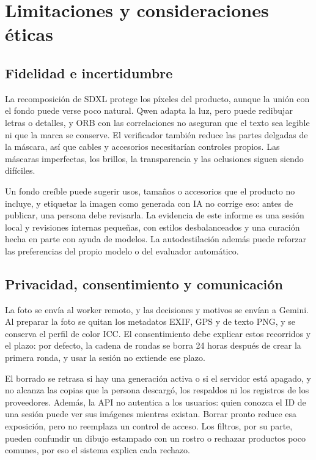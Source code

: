 \documentclass[11pt,a4paper]{article}
\begin{document}
\clearpage
\section{Limitaciones y consideraciones éticas}
\subsection{Fidelidad e incertidumbre}
La recomposición de SDXL protege los píxeles del producto, aunque la unión con el fondo puede verse poco natural. Qwen adapta la luz, pero puede redibujar letras o detalles, y ORB con las correlaciones no aseguran que el texto sea legible ni que la marca se conserve. El verificador también reduce las partes delgadas de la máscara, así que cables y accesorios necesitarían controles propios. Las máscaras imperfectas, los brillos, la transparencia y las oclusiones siguen siendo difíciles.

Un fondo creíble puede sugerir usos, tamaños o accesorios que el producto no incluye, y etiquetar la imagen como generada con IA no corrige eso: antes de publicar, una persona debe revisarla. La evidencia de este informe es una sesión local y revisiones internas pequeñas, con estilos desbalanceados y una curación hecha en parte con ayuda de modelos. La autodestilación además puede reforzar las preferencias del propio modelo o del evaluador automático.

\subsection{Privacidad, consentimiento y comunicación}
La foto se envía al worker remoto, y las decisiones y motivos se envían a Gemini. Al preparar la foto se quitan los metadatos EXIF, GPS y de texto PNG, y se conserva el perfil de color ICC. El consentimiento debe explicar estos recorridos y el plazo: por defecto, la cadena de rondas se borra 24 horas después de crear la primera ronda, y usar la sesión no extiende ese plazo.

El borrado se retrasa si hay una generación activa o si el servidor está apagado, y no alcanza las copias que la persona descargó, los respaldos ni los registros de los proveedores. Además, la API no autentica a los usuarios: quien conozca el ID de una sesión puede ver sus imágenes mientras existan. Borrar pronto reduce esa exposición, pero no reemplaza un control de acceso. Los filtros, por su parte, pueden confundir un dibujo estampado con un rostro o rechazar productos poco comunes, por eso el sistema explica cada rechazo.
\end{document}
